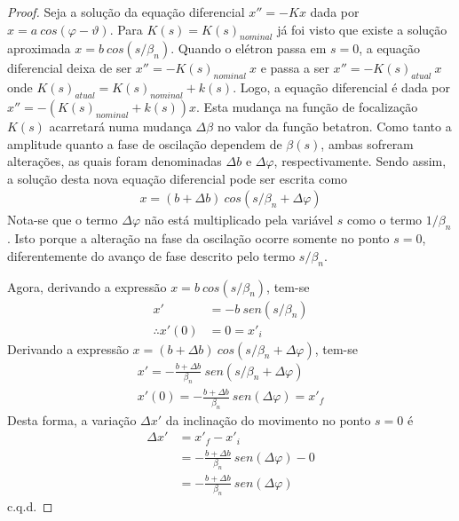 \begin{proof}
	Seja a solução da equação diferencial $x'' = -Kx$ dada por $x = a\ cos(\varphi-\vartheta)$. Para $K(s) = K(s)_{nominal}$ já foi visto que existe a solução aproximada $x = b\ cos(s/\beta_n)$. Quando o elétron passa em $s=0$, a equação diferencial deixa de ser $x'' = -K(s)_{nominal}\ x$ e passa a ser $x'' = -K(s)_{atual}\ x$ onde $K(s)_{atual} = K(s)_{nominal} + k(s)$. Logo, a equação diferencial é dada por $x'' = -(K(s)_{nominal} + k(s))x$. Esta mudança na função de focalização $K(s)$ acarretará numa mudança $\Delta \beta$ no valor da função betatron. Como tanto a amplitude quanto a fase de oscilação dependem de $\beta(s)$, ambas sofreram alterações, as quais foram denominadas $\Delta b$ e $\Delta \varphi$, respectivamente. Sendo assim, a solução desta nova equação diferencial pode ser escrita como
	\begin{align*}
		x = (b+\Delta b)\ cos(s/\beta_n + \Delta \varphi)
	\end{align*}
	Nota-se que o termo $\Delta \varphi$ não está multiplicado pela variável $s$ como o termo $1/\beta_n$. Isto porque a alteração na fase da oscilação ocorre somente no ponto $s=0$, diferentemente do avanço de fase descrito pelo termo $s/\beta_n$.
	
	Agora, derivando a expressão $x = b\ cos(s/\beta_n)$, tem-se
	\begin{align*}
		x' &= -b\ sen(s/\beta_n)\\
		\therefore x'(0) &= 0 = x'_i
	\end{align*}
	Derivando a expressão $x = (b+\Delta b)\ cos(s/\beta_n + \Delta \varphi)$, tem-se
	\begin{align*}
		x' = -\frac{b+\Delta b}{\beta_n}\ sen(s/\beta_n + \Delta \varphi)\\
		x'(0) = -\frac{b+\Delta b}{\beta_n}\ sen(\Delta \varphi) = x'_f
	\end{align*}
	Desta forma, a variação $\Delta x'$ da inclinação do movimento no ponto $s=0$ é
	\begin{align*}
		\Delta x' &= x'_f - x'_i\\
				  &= -\frac{b+\Delta b}{\beta_n}\ sen(\Delta \varphi) - 0\\
				  & = -\frac{b+\Delta b}{\beta_n}\ sen(\Delta \varphi)
	\end{align*}
	c.q.d.
\end{proof}

